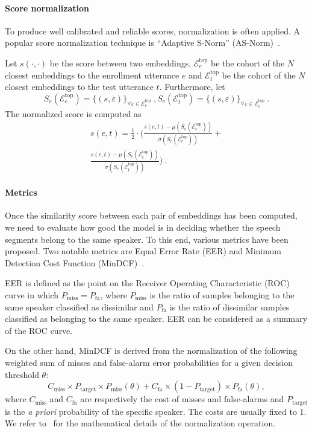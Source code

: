 \documentclass[conference]{IEEEtran}
\begin{document}
\paragraph{Score normalization}To produce well calibrated and reliable scores, normalization is often applied. A popular score normalization technique is ``Adaptive S-Norm'' (AS-Norm)~\cite{matejka2017asnorm,cumani2011comparison}.

Let $s(\cdot,\cdot)$ be the score between two embeddings, $\mathcal{E}^{\text{top}}_e$ be the cohort of the $N$ closest embeddings to the enrollment utterance $e$ and $\mathcal{E}^{\text{top}}_t$ be the cohort of the $N$ closest embeddings to the test utterance $t$. Furthermore, let 
\begin{equation}
    S_e(\mathcal{E}^{\text{top}}_e) = \{(s,\varepsilon)\}_{\forall\varepsilon \in \mathcal{E}^{\text{top}}_e}~,
    S_e(\mathcal{E}^{\text{top}}_t) = \{(s,\varepsilon)\}_{\forall\varepsilon \in \mathcal{E}^{\text{top}}_t}~. 
\end{equation}
The normalized score is computed as
\begin{multline}
    s(e,t) = \frac{1}{2} \cdot \Bigg(\frac{s(e,t) - \mu(S_e(\mathcal{E}^{\text{top}}_e))}{\sigma(S_e(\mathcal{E}^{\text{top}}_e))} + \\
    \frac{s(e,t) - \mu(S_e(\mathcal{E}^{\text{top}}_t))}{\sigma(S_e(\mathcal{E}^{\text{top}}_t))}\Bigg)
    ~.
\end{multline}

\paragraph{Metrics}Once the similarity score between each pair of embeddings has been computed, we need to evaluate how good the model is in deciding whether the speech segments belong to the same speaker. To this end, various metrics have been proposed. Two notable metrics are Equal Error Rate (EER) and Minimum Detection Cost Function (MinDCF)~\cite{brummer2013bosaris,nist2018}. 

EER is defined as the point on the Receiver Operating Characteristic (ROC) curve in which $P_{\text{miss}} = P_{\text{fa}}$, where $P_{\text{miss}}$ is the ratio of samples belonging to the same speaker classified as dissimilar and $P_{\text{fa}}$ is the ratio of dissimilar samples classified as belonging to the same speaker. EER can be considered as a summary of the ROC curve.

On the other hand, MinDCF is derived from the normalization of the following weighted sum of misses and false-alarm error probabilities for a given decision threshold $\theta$:
\begin{equation}
    C_{\text{miss}} \times P_{\text{target}} \times P_{\text{miss}}(\theta) +
    C_{\text{fa}} \times (1 - P_{\text{target}}) \times P_{\text{fa}}(\theta) ,
\end{equation}
where $C_{\text{miss}}$ and $C_{\text{fa}}$ are respectively the cost of misses and false-alarms and $P_{\text{target}}$ is the \textit{a priori} probability of the specific speaker. The costs are usually fixed to 1. We refer to~\cite{nist2018} for the mathematical details of the normalization operation.
\end{document}
